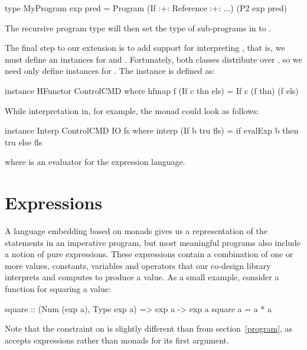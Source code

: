 \documentclass[../paper.tex]{subfiles}
\begin{document}
\begin{code}
type MyProgram exp pred = Program (If :+: Reference :+: ...) (P2 exp pred)
\end{code}

\noindent The recursive program type will then set the type of sub-programs in  to .

The final step to our extension is to add support for interpreting , that is, we must define an instances for  and . Fortunately, both classes distribute over \codei{(:+:)}, so we need only define instances for . The  instance is defined as:

\begin{code}
instance HFunctor ControlCMD where
  hfmap f (If c thn els) = If c (f thn) (f els)
\end{code}

\noindent While interpretation in, for example, the  monad could look as follows:

\begin{code}
instance Interp ControlCMD IO fs where
  interp (If b tru fls) = if evalExp b then tru else fls
\end{code}

\noindent where  is an evaluator for the expression language.

\section{Expressions}
\label{expr}

A language embedding based on monads gives us a representation of the statements in an imperative program, but most meaningful programs also include a notion of pure expressions. These expressions contain a combination of one or more values, constants, variables and operators that our co-design library interprets and computes to produce a value. As a small example, consider a function for squaring a value:

\begin{code}
square :: (Num (exp a), Type exp a) => exp a -> exp a
square a = a * a
\end{code}

\noindent Note that the  constraint on  is slightly different than  from section~\ref{program}, as  accepts expressions rather than monads for its first argument.
\end{document}
